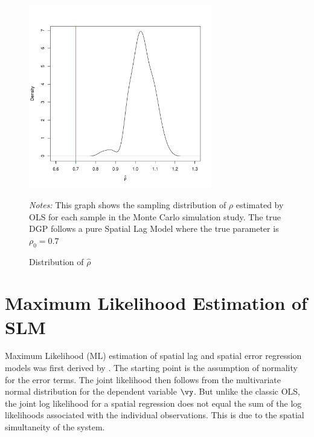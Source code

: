 \begin{figure}[ht]
  \caption{Distribution of $\widehat{\rho}$}
    \label{fig:ols-rho-sim}
    \centering 
	\begin{minipage}{.9\linewidth}
\begin{knitrout}
\color{fgcolor}

{\centering \includegraphics[width=8cm,height=8cm]{figure/ols-rho-sim-1} 

}


\end{knitrout}
\footnotesize
		\emph{Notes:} This graph shows the sampling distribution of $\rho$ estimated by OLS for each sample in the Monte Carlo simulation study. The true DGP follows a pure Spatial Lag Model where the true parameter is $\rho_0 = 0.7$
	\end{minipage}	
\end{figure}

\section{Maximum Likelihood Estimation of SLM}

Maximum Likelihood (ML) estimation of spatial lag and spatial error regression models was first derived by \cite{ord1975estimation}. The starting point is the assumption of normality for the error terms. The joint likelihood then follows from the multivariate normal distribution for the dependent variable $\vy$. But unlike the classic OLS, the joint log likelihood for a spatial regression does not equal the sum of the log likelihoods associated with the individual observations. This is due to the spatial simultaneity of the system.

